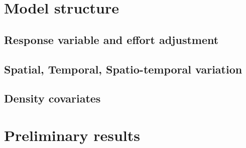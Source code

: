 \documentclass[
]{article}
\begin{document}
\hypertarget{model-structure}{%
\section{Model structure}\label{model-structure}}

\hypertarget{response-variable-and-effort-adjustment}{%
\subsection{Response variable and effort adjustment}\label{response-variable-and-effort-adjustment}}

\hypertarget{spatial-temporal-spatio-temporal-variation}{%
\subsection{Spatial, Temporal, Spatio-temporal variation}\label{spatial-temporal-spatio-temporal-variation}}

\hypertarget{density-covariates}{%
\subsection{Density covariates}\label{density-covariates}}

\hypertarget{preliminary-results}{%
\section{Preliminary results}\label{preliminary-results}}
\end{document}

